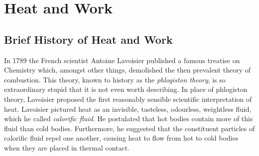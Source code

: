 \chapter{Heat and Work}\label{s4}

\section{Brief History of Heat and Work}\label{s4.1}
In 1789 the French scientist Antoine Lavoisier published a famous treatise
 on Chemistry
which, amongst other things, demolished the then 
prevalent theory of combustion. 
This theory, known to history as the {\em phlogiston theory}, is so
extraordinary stupid that it is not even worth describing.
In place of  phlogiston theory, Lavoisier proposed the first reasonably 
sensible scientific interpretation  of heat. Lavoisier pictured heat 
as an invisible, tasteless, odourless, weightless 
 fluid, which he called {\em calorific fluid}. He postulated that 
hot bodies 
contain more of this  fluid than cold bodies. Furthermore, he
suggested  that the constituent particles 
of calorific  fluid repel one another, causing  heat to flow from
hot to cold bodies when they are placed in thermal contact. 

